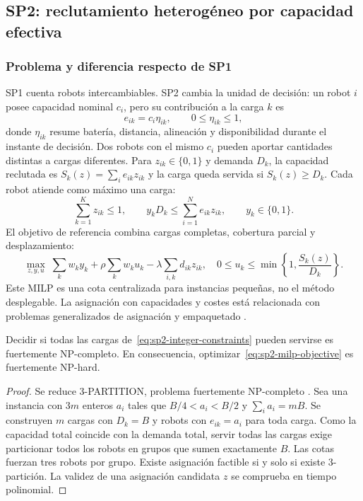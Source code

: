 \subsection{SP2: reclutamiento heterogéneo por capacidad efectiva}
\label{sec:resultados-sp2}

\subsubsection{Problema y diferencia respecto de SP1}

SP1 cuenta robots intercambiables. SP2 cambia la unidad de decisión: un robot $i$
posee capacidad nominal $c_i$, pero su contribución a la carga $k$ es
\begin{equation}
 e_{ik}=c_i\eta_{ik},\qquad 0\leq\eta_{ik}\leq1,
 \label{eq:sp2-effective-pair}
\end{equation}
donde $\eta_{ik}$ resume batería, distancia, alineación y disponibilidad durante el
instante de decisión. Dos robots con el mismo $c_i$ pueden aportar cantidades distintas
a cargas diferentes. Para $z_{ik}\in\{0,1\}$ y demanda $D_k$, la capacidad reclutada es
$S_k(z)=\sum_i e_{ik}z_{ik}$ y la carga queda servida si $S_k(z)\geq D_k$.
Cada robot atiende como máximo una carga:
\begin{equation}
 \sum_{k=1}^{K}z_{ik}\leq1,
 \qquad
 y_kD_k\leq\sum_{i=1}^{N}e_{ik}z_{ik},
 \qquad y_k\in\{0,1\}.
 \label{eq:sp2-integer-constraints}
\end{equation}
El objetivo de referencia combina cargas completas, cobertura parcial y desplazamiento:
\begin{equation}
 \max_{z,y,u}\;
 \sum_kw_ky_k+\rho\sum_kw_ku_k-\lambda\sum_{i,k}d_{ik}z_{ik},
 \quad
 0\leq u_k\leq\min\left\{1,\frac{S_k(z)}{D_k}\right\}.
 \label{eq:sp2-milp-objective}
\end{equation}
Este MILP es una cota centralizada para instancias pequeñas, no el método desplegable.
La asignación con capacidades y costes está relacionada con problemas generalizados de
asignación y empaquetado \citep{shmoys1993generalized,gerkey2004formal,korsah2013taxonomy}.

\begin{proposicion}
Decidir si todas las cargas de~\eqref{eq:sp2-integer-constraints} pueden servirse es
fuertemente NP-completo. En consecuencia, optimizar~\eqref{eq:sp2-milp-objective} es
fuertemente NP-hard.
\end{proposicion}
\begin{proof}
Se reduce 3-PARTITION, problema fuertemente NP-completo
\citep{garey1978strong}. Sea una instancia con $3m$ enteros $a_i$ tales que
$B/4<a_i<B/2$ y $\sum_i a_i=mB$. Se construyen $m$ cargas con $D_k=B$ y robots
con $e_{ik}=a_i$ para toda carga. Como la capacidad total coincide con la demanda
total, servir todas las cargas exige particionar todos los robots en grupos que sumen
exactamente $B$. Las cotas fuerzan tres robots por grupo. Existe asignación factible si
y solo si existe 3-partición. La validez de una asignación candidata $z$ se comprueba en tiempo polinomial.
\end{proof}

